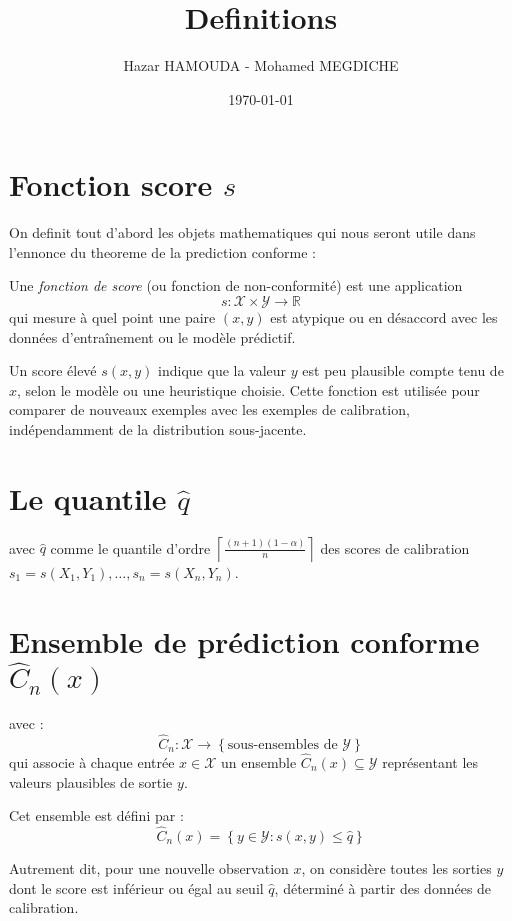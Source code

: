 \documentclass[a4paper,11pt]{article}%
\title{Definitions}
\author{Hazar HAMOUDA - Mohamed MEGDICHE}
\date{\today}
\begin{document}
\maketitle

\section{Fonction score $s$} 


On definit tout d'abord les objets mathematiques qui  nous seront utile dans l'ennonce du theoreme de la prediction conforme : 

Une \emph{fonction de score} (ou fonction de non-conformité) est une application
\[
s : \mathcal{X} \times \mathcal{Y} \rightarrow \mathbb{R}
\]
qui mesure à quel point une paire $(x, y)$ est atypique ou en désaccord avec les données d'entraînement ou le modèle prédictif.

Un score élevé $s(x, y)$ indique que la valeur $y$ est peu plausible compte tenu de $x$, selon le modèle ou une heuristique choisie. Cette fonction est utilisée pour comparer de nouveaux exemples avec les exemples de calibration, indépendamment de la distribution sous-jacente.
\section{ Le quantile $\hat{q}$}
     avec $\hat{q}$ comme le quantile d'ordre $\left\lceil \frac{(n+1)(1 - \alpha)}{n} \right\rceil$ des scores de calibration $s_1 = s(X_1, Y_1), \dots, s_n = s(X_n, Y_n)$.
\section{Ensemble de prédiction conforme $\hat{C}_n(x)$}


    avec : 
    \[
    \hat{C}_n : \mathcal{X} \rightarrow \left\{ \text{sous-ensembles de } \mathcal{Y} \right\}
    \]
    qui associe à chaque entrée $x \in \mathcal{X}$ un ensemble $\hat{C}_n(x) \subseteq \mathcal{Y}$ représentant les valeurs plausibles de sortie $y$.
    
    Cet ensemble est défini par :
    \[
    \hat{C}_n(x) = \left\{ y \in \mathcal{Y} : s(x, y) \leq \hat{q} \right\}
    \]
    
    Autrement dit, pour une nouvelle observation $x$, on considère toutes les sorties $y$ dont le score est inférieur ou égal au seuil $\hat{q}$, déterminé à partir des données de calibration. 
    
\end{document}
